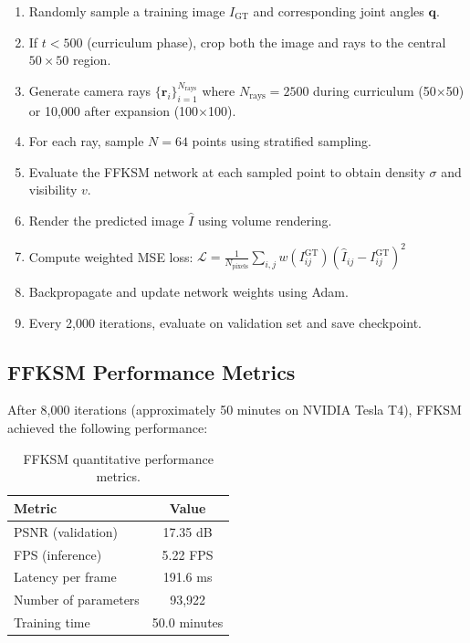 ﻿\documentclass[12pt,a4paper,oneside]{report}
\begin{document}
\begin{enumerate}
    \item Randomly sample a training image $I_{\text{GT}}$ and corresponding joint angles $\mathbf{q}$.
    \item If $t < 500$ (curriculum phase), crop both the image and rays to the central $50 \times 50$ region.
    \item Generate camera rays $\{\mathbf{r}_i\}_{i=1}^{N_{\text{rays}}}$ where $N_{\text{rays}} = 2500$ during curriculum (50$\times$50) or 10,000 after expansion (100$\times$100).
    \item For each ray, sample $N=64$ points using stratified sampling.
    \item Evaluate the FFKSM network at each sampled point to obtain density $\sigma$ and visibility $v$.
    \item Render the predicted image $\hat{I}$ using volume rendering.
    \item Compute weighted MSE loss: $\mathcal{L} = \frac{1}{N_{\text{pixels}}} \sum_{i,j} w(I_{ij}^{\text{GT}}) (\hat{I}_{ij} - I_{ij}^{\text{GT}})^2$
    \item Backpropagate and update network weights using Adam.
    \item Every 2,000 iterations, evaluate on validation set and save checkpoint.
\end{enumerate}

\subsection{FFKSM Performance Metrics}

After 8,000 iterations (approximately 50 minutes on NVIDIA Tesla T4), FFKSM achieved the following performance:

\begin{table}[H]
\centering
\caption{FFKSM quantitative performance metrics.}
\label{tab:ffksm_performance}
\begin{tabular}{lc}
\toprule
Metric & Value \\
\midrule
PSNR (validation) & 17.35 dB \\
FPS (inference) & 5.22 FPS \\
Latency per frame & 191.6 ms \\
Number of parameters & 93,922 \\
Training time & 50.0 minutes \\
\bottomrule
\end{tabular}
\end{table}
\end{document}

